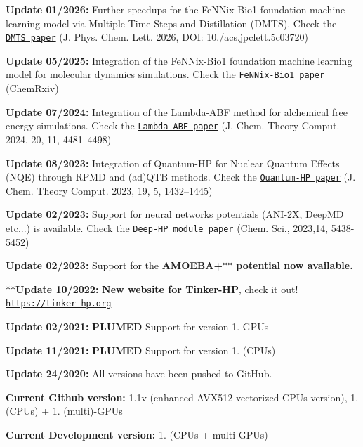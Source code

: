 
\begin{DoxyItemize}
\item {\bfseries Update 01/2026\-:} Further speedups for the Fe\-N\-Nix-\/\-Bio1 foundation machine learning model via Multiple Time Steps and Distillation (D\-M\-T\-S). Check the \href{https://pubs.acs.org/doi/full/10.1021/acs.jpclett.5c03720}{\tt D\-M\-T\-S paper} (J. Phys. Chem. Lett. 2026, D\-O\-I\-: 10./acs.jpclett.\-5c03720)
\item {\bfseries Update 05/2025\-:} Integration of the Fe\-N\-Nix-\/\-Bio1 foundation machine learning model for molecular dynamics simulations. Check the \href{https://doi.org/10.26434/chemrxiv-2025-f1hgn-v4}{\tt Fe\-N\-Nix-\/\-Bio1 paper} (Chem\-Rxiv)
\item {\bfseries Update 07/2024\-:} Integration of the Lambda-\/\-A\-B\-F method for alchemical free energy simulations. Check the \href{https://doi.org/10.1021/acs.jctc.3c01249}{\tt Lambda-\/\-A\-B\-F paper} (J. Chem. Theory Comput. 2024, 20, 11, 4481–4498)
\item {\bfseries Update 08/2023\-:} Integration of Quantum-\/\-H\-P for Nuclear Quantum Effects (N\-Q\-E) through R\-P\-M\-D and (ad)Q\-T\-B methods. Check the \href{https://doi.org/10.1021/acs.jctc.2c01233}{\tt Quantum-\/\-H\-P paper} (J. Chem. Theory Comput. 2023, 19, 5, 1432–1445)
\item {\bfseries Update 02/2023\-:} Support for neural networks potentials (A\-N\-I-\/2\-X, Deep\-M\-D etc...) is available. Check the \href{https://doi.org/10.1039/D2SC04815A}{\tt Deep-\/\-H\-P module paper} (Chem. Sci., 2023,14, 5438-\/5452)
\item {\bfseries Update 02/2023\-:} Support for the {\bfseries A\-M\-O\-E\-B\-A+$\ast$$\ast$ potential now available.}
\item {\bfseries $\ast$$\ast$\-Update 10/2022\-:} {\bfseries New website for Tinker-\/\-H\-P}, check it out! \href{https://tinker-hp.org}{\tt https\-://tinker-\/hp.\-org}
\item {\bfseries Update 02/2021\-:} {\bfseries P\-L\-U\-M\-E\-D} Support for version 1. G\-P\-Us
\item {\bfseries Update 11/2021\-:} {\bfseries P\-L\-U\-M\-E\-D} Support for version 1. (C\-P\-Us)
\item {\bfseries Update 24/2020\-:} All versions have been pushed to Git\-Hub. 


\end{DoxyItemize}


\begin{DoxyItemize}
\item {\bfseries Current Github version\-:} 1.\-1v (enhanced A\-V\-X512 vectorized C\-P\-Us version), 1. (C\-P\-Us) + 1. (multi)-\/\-G\-P\-Us
\item {\bfseries Current Development version\-:} 1. (C\-P\-Us + multi-\/\-G\-P\-Us)
\end{DoxyItemize}

